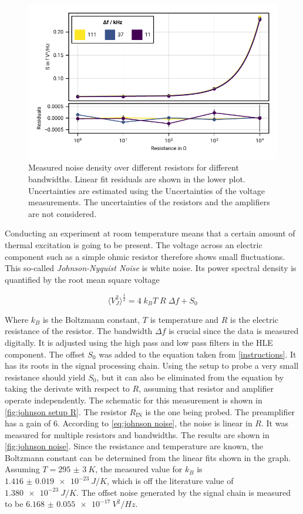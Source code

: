 \documentclass[
    parskip=half, 
    twoside=false,
    twocolumn=true,
    fontsize=11pt,
]{scrarticle}
\begin{document}
\begin{figure}[h!]
    \centering
    \includegraphics{figures/01 johnson noise.pdf}
    \caption{
        Measured noise density over different resistors for different bandwidths.
        Linear fit residuals are shown in the lower plot.
        Uncertainties are estimated using the Uncertainties of the voltage measurements.
        The uncertainties of the resistors and the amplifiers are not considered.
    }
    \label{fig:johnson noise}
\end{figure}

Conducting an experiment at room temperature means that a certain amount of thermal excitation is going to be present. The voltage across an electric component such as a simple ohmic resistor therefore shows small fluctuations. This so-called \textit{Johnson-Nyquist Noise} is white noise. Its power spectral density is quantified by the root mean square voltage

\begin{equation}
    \label{eq:johnson noise}
    \langle V_J^2 \rangle^{\frac{1}{2}} = 4\; k_B T\; R\; \Delta f + S_0
\end{equation} 

Where $k_B$ is the Boltzmann constant, $T$ is temperature and $R$ is the electric resistance of the resistor. The bandwidth $\Delta f$ is crucial since the data is measured digitally. It is adjusted using the high pass and low pass filters in the HLE component. The offset $S_0$ was added to the equation taken from \autoref{instructions}. It has its roots in the signal processing chain. Using the setup to probe a very small resistance should yield $S_0$, but it can also be eliminated from the equation by taking the derivate with respect to $R$, assuming that resistor and amplifier operate independently. The schematic for this measurement is shown in \autoref{fig:johnson setup R}. The resistor $R_\text{IN}$ is the one being probed. The preamplifier has a gain of $6$.  According to \autoref{eq:johnson noise}, the noise is linear in $R$. It was measured for multiple resistors and bandwidths. The results are shown in \autoref{fig:johnson noise}. Since the resistance and temperature are known, the Boltzmann constant can be determined from the linear fits shown in the graph. Assuming $T=\SI{295(3)}{K}$, the measured value for $k_B$ is $\SI{1.416(19)e-23}{J/K}$, which is off the literature value of $\SI{1.380e-23}{J/K}$. The offset noise generated by the signal chain is measured to be $\SI{6.168(55)e-17}{V^2/Hz}$.
\end{document}
